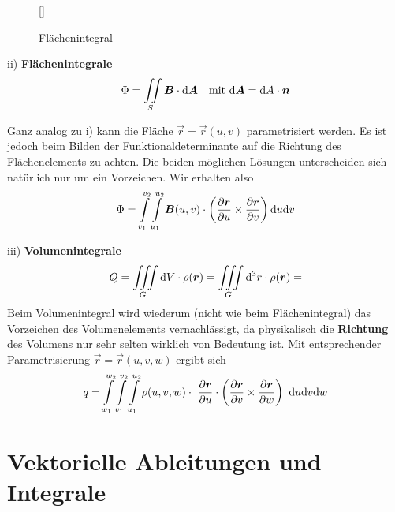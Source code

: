 \begin{wrapfigure}[10]{r}[0cm]{0cm}
	\raisebox{0pt}[\dimexpr{}\baselineskip\relax]{
		\colorbox{hgrey}{
		}
	}
	\caption{Flächenintegral}
\end{wrapfigure}


ii) \textbf{Flächenintegrale}\\
\begin{equation*}
\Phi=\iint\limits_{S}\bm{B}\cdot\mathrm{d} \bm{A} \ \ \ \text{mit } \mathrm{d}\bm{A}=\mathrm{d} A\cdot\bm{n}
\end{equation*}


Ganz analog zu i) kann die Fläche $\vec{r}=\vec{r}(u,v)$ parametrisiert werden. Es ist jedoch beim Bilden der Funktionaldeterminante auf die Richtung des Flächenelements zu achten. Die beiden möglichen Lösungen unterscheiden sich natürlich nur um ein Vorzeichen. Wir erhalten also
\begin{equation*}
\Phi=\int\limits_{v_1}^{v_2}\int\limits_{u_1}^{u_2}\bm{B}(u,v)\cdot\left(\frac{\partial{\bm{r}}}{\partial{u}}\times\frac{\partial{\bm{r}}}{\partial{v}}\right)\mathrm{d} u\mathrm{d} v
\end{equation*}

iii) \textbf{Volumenintegrale}\\
\linebreak
\begin{equation*}
Q=\iiint\limits_G\mathrm{d} V\cdot\rho(\bm{r})=\iiint\limits_G\mathrm{d} ^3 r\cdot\rho(\bm{r})=
\end{equation*}
Beim Volumenintegral wird wiederum (nicht wie beim Flächenintegral) das Vorzeichen des Volumenelements vernachlässigt, da physikalisch die \textbf{Richtung} des Volumens nur sehr selten wirklich von Bedeutung ist. Mit entsprechender Parametrisierung $\vec{r}=\vec{r}(u,v,w)$ ergibt sich
\begin{equation*}
q=\int\limits_{w_1}^{w_2}\int\limits_{v_1}^{v_2}\int\limits_{u_1}^{u_2}\rho(u,v,w)\cdot\left|\frac{\partial{\bm{r}}}{\partial{u}}\cdot\left(\frac{\partial{\bm{r}}}{\partial{v}}\times\frac{\partial{\bm{r}}}{\partial{w}}\right)\right|\mathrm{d} u\mathrm{d} v\mathrm{d} w
\end{equation*}

\section{Vektorielle Ableitungen und Integrale}

